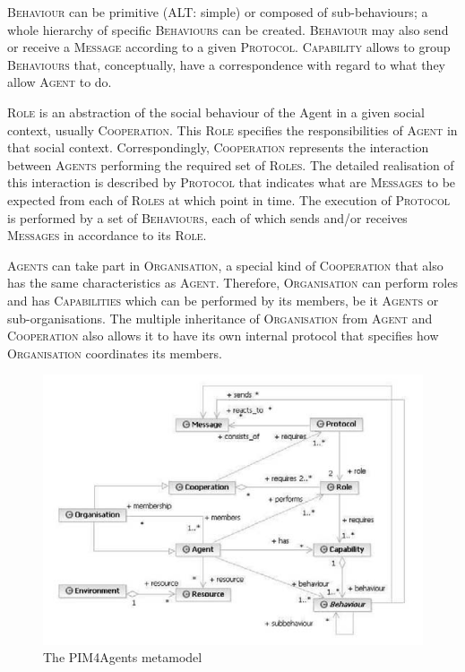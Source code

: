 \textsc{Behaviour} can be primitive (ALT: simple) or composed of sub-behaviours; a whole hierarchy of specific \textsc{Behaviours} can be created.
\textsc{Behaviour} may also send or receive a \textsc{Message} according to a given \textsc{Protocol}.
\textsc{Capability} allows to group \textsc{Behaviours} that, conceptually, have a correspondence with regard to what they allow \textsc{Agent} to do.

\textsc{Role} is an abstraction of the social behaviour of the Agent in a given social context, usually \textsc{Cooperation}.
This \textsc{Role} specifies the responsibilities of \textsc{Agent} in that social context.
Correspondingly, \textsc{Cooperation} represents the interaction between \textsc{Agents} performing the required set of \textsc{Roles}.
The detailed realisation of this interaction is described by \textsc{Protocol} that indicates what are \textsc{Messages} to be expected from each of \textsc{Roles} at which point in time.
The execution of \textsc{Protocol} is performed by a set of \textsc{Behaviours}, each of which sends and/or receives \textsc{Messages} in accordance to its \textsc{Role}.

\textsc{Agents} can take part in \textsc{Organisation}, a special kind of \textsc{Cooperation} that also has the same characteristics as \textsc{Agent}.
Therefore, \textsc{Organisation} can perform roles and has \textsc{Capabilities} which can be performed by its members, be it \textsc{Agents} or sub-organisations.
The multiple inheritance of \textsc{Organisation} from \textsc{Agent} and \textsc{Cooperation} also allows it to have its own internal protocol that specifies how \textsc{Organisation} coordinates its members.

\begin{figure}[ht]
	\centering
	\includegraphics[width=\textwidth]{images/pim4agents-metamodel.png}
	\caption{The PIM4Agents metamodel}
	\label{figure:pim4agents-metamodel}
\end{figure}

